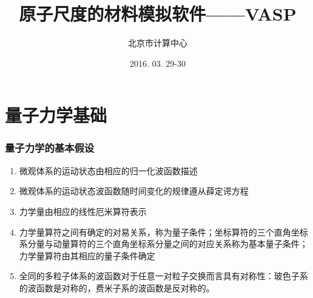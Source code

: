 \documentclass[cjk,slidestop,compress,mathserif,blue]{beamer}
\begin{document}
\graphicspath{{Figures/}}


\title{原子尺度的材料模拟软件——VASP}

\author{北京市计算中心}%
\date{\textrm{2016. 03. 29-30}}
\frame{\titlepage}

\section*{}

\small
\section{量子力学基础}
\frame
{
	\frametitle{量子力学的基本假设}
	\begin{enumerate}
		\item 微观体系的运动状态由相应的归一化波函数描述
		\item 微观体系的运动状态波函数随时间变化的规律遵从薛定谔方程
		\item 力学量由相应的线性厄米算符表示
		\item 力学量算符之间有确定的对易关系，称为量子条件；坐标算符的三个直角坐标系分量与动量算符的三个直角坐标系分量之间的对应关系称为基本量子条件；力学量算符由其相应的量子条件确定
		\item 全同的多粒子体系的波函数对于任意一对粒子交换而言具有对称性：玻色子系的波函数是对称的，费米子系的波函数是反对称的。
	\end{enumerate}
}
\end{document}
